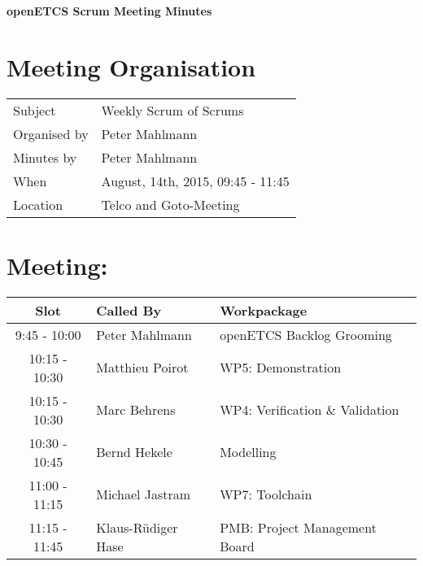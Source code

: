 \documentclass[a4paper, 11pt]{article}
\begin{document}
{\begin{center}\huge\bf openETCS Scrum Meeting Minutes\end{center}}
\section{Meeting Organisation}

\renewcommand{\arraystretch}{1.5}
\begin{supertabular}{m{.2\textwidth}m{.8\textwidth}}
Subject & Weekly Scrum of Scrums\\
Organised by & Peter Mahlmann\\
Minutes by & Peter Mahlmann\\
When & August, 14th, 2015, 09:45 - 11:45\\
Location & Telco and Goto-Meeting\\
\end{supertabular}

\renewcommand{\arraystretch}{1.0}
\section{Meeting:}

\begin{tabular}{|c|l|l|}
\hline
\textbf{Slot} &  \textbf{Called By} & \textbf{Workpackage} \\
\hline  
9:45 - 10:00 & Peter Mahlmann & openETCS Backlog Grooming  \\\hline
10:15 - 10:30 & Matthieu Poirot & WP5: Demonstration \\\hline  
10:15 - 10:30 & Marc Behrens & WP4: Verification \& Validation \\\hline 
10:30 - 10:45 & Bernd Hekele & Modelling \\\hline
11:00 - 11:15 & Michael Jastram  & WP7: Toolchain \\\hline
11:15 - 11:45 & Klaus-R\"udiger Hase & PMB: Project Management Board \\\hline  
\end{tabular}
\end{document}
